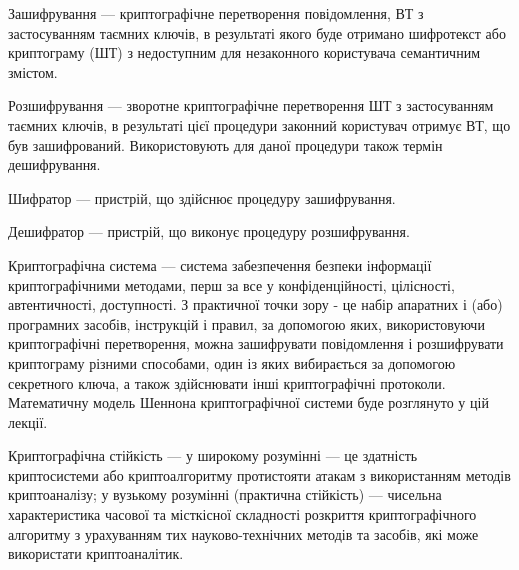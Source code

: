 \begin{definition}[Зашифрування]
    Зашифрування --- криптографічне перетворення повідомлення, ВТ з
    застосуванням таємних ключів, в результаті якого буде отримано шифротекст
    або криптограму (ШТ) з недоступним для незаконного користувача семантичним
    змістом.
\end{definition}

\begin{definition}[Розшифрування]
    Розшифрування --- зворотне криптографічне перетворення ШТ з застосуванням
    таємних ключів, в результаті цієї процедури законний користувач отримує ВТ,
    що був зашифрований.  Використовують для даної процедури також термін
    дешифрування.
\end{definition}

\begin{definition}[Шифратор]
    Шифратор --- пристрій, що здійснює процедуру зашифрування.
\end{definition}

\begin{definition}[Дешифратор]
    Дешифратор --- пристрій, що виконує процедуру розшифрування.
\end{definition}

\begin{definition}
    Криптографічна система --- система забезпечення безпеки інформації
    криптографічними методами, перш за все у конфіденційності, цілісності,
    автентичності, доступності. З практичної точки зору -  це набір апаратних і
    (або) програмних засобів, інструкцій і правил, за допомогою яких,
    використовуючи криптографічні перетворення, можна зашифрувати повідомлення і
    розшифрувати криптограму різними способами, один із яких вибирається за
    допомогою секретного ключа, а також здійснювати інші криптографічні
    протоколи. Математичну модель Шеннона криптографічної системи буде
    розглянуто у цій лекції.
\end{definition}

\begin{definition}
    Криптографічна стійкість --- у широкому розумінні --- це здатність
    криптосистеми або криптоалгоритму протистояти атакам з використанням методів
    криптоаналізу; у вузькому розумінні (практична стійкість) --- чисельна
    характеристика часової та місткісної складності розкриття криптографічного
    алгоритму з урахуванням тих науково-технічних методів та засобів, які може
    використати криптоаналітик.
\end{definition}

